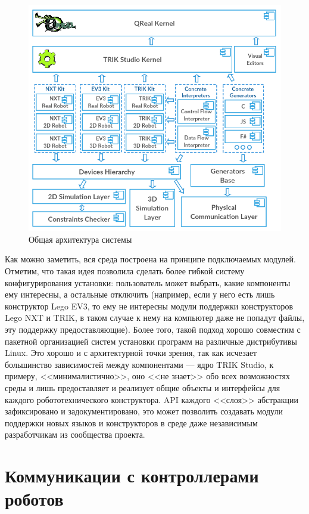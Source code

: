 \documentclass[a5paper]{article}
\begin{document}
\begin{figure}[ht]
    \centering
    \includegraphics[width=4.5in]{TS_Common_Architecture.png}
    \caption{Общая архитектура системы}
    \label{image:commonTSArch}
\end{figure}

Как можно заметить, вся среда построена на принципе подключаемых модулей. Отметим, что такая идея позволила сделать более гибкой систему конфигурирования установки: пользователь может выбрать, какие компоненты ему интересны, а остальные отключить (например, если у него есть лишь конструктор Lego EV3, то ему не интересны модули поддержки конструкторов Lego NXT и TRIK, в таком случае к нему на компьютер даже не попадут файлы, эту поддержку предоставляющие). Более того, такой подход хорошо совместим с пакетной организацией систем установки программ на различные дистрибутивы Linux. Это хорошо и с архитектурной точки зрения, так как исчезает большинство зависимостей между компонентами --- ядро TRIK Studio, к примеру, <<минималистично>>, оно <<не знает>> обо всех возможностях среды и лишь предоставляет и реализует общие объекты и интерфейсы для каждого робототехнического конструктора. API каждого <<слоя>> абстракции  зафиксировано и задокументировано, это может позволить создавать модули поддержки новых языков и конструкторов в среде даже независимым разработчикам из сообщества проекта.

\section{Коммуникации с контроллерами роботов}
\label{chapter:communications}
\end{document}
